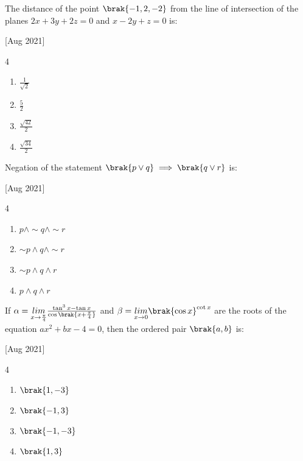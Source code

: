     \item The distance of the point $\brak{-1, 2, -2}$ from the line of intersection of the planes $2x+3y+2z=0$ and $x-2y+z=0$ is:
    
    \hfill{[Aug 2021]}

        \begin{multicols}{4}
            \begin{enumerate}
                \item $\frac{1}{\sqrt{2}}$
                \item $\frac{5}{2}$
                \item $\frac{\sqrt{42}}{2}$
                \item $\frac{\sqrt{34}}{2}$
            \end{enumerate}
        \end{multicols}

    \item Negation of the statement $\brak{p\lor q}\implies\brak{q\lor r}$ is:
    
    \hfill{[Aug 2021]}

        \begin{multicols}{4}
            \begin{enumerate}
                \item $p\land \sim q\land \sim r$
                \item $\sim p\land q\land \sim r$
                \item $\sim p\land q\land r$
                \item $p\land q\land r$
            \end{enumerate}
        \end{multicols}
		
    \item If $\alpha=\underset{x\to\frac{\pi}{4}}{lim}\frac{\tan^3 x-\tan x}{\cos\brak{x+\frac{\pi}{4}}}$ and $\beta=\underset{x\to 0}{lim}\brak{\cos x}^{\cot x}$ are the roots of the equation $ax^2+bx-4=0$, then the ordered pair $\brak{a,b}$ is:
    
    \hfill{[Aug 2021]}

        \begin{multicols}{4}
            \begin{enumerate}
                \item $\brak{1,-3}$
                \item $\brak{-1,3}$
                \item $\brak{-1,-3}$
                \item $\brak{1,3}$
            \end{enumerate}
        \end{multicols}

